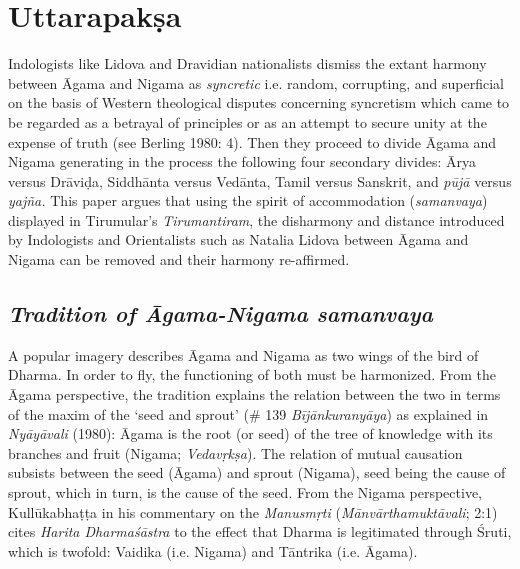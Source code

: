 \section*{Uttarapakṣa}

Indologists like Lidova and Dravidian nationalists dismiss the extant harmony between Āgama and Nigama as \textit{syncretic} i.e. random, corrupting, and superficial on the basis of Western theological disputes concerning syncretism which came to be regarded as a betrayal of principles or as an attempt to secure unity at the expense of truth (see Berling 1980: 4). Then they proceed to divide Āgama and Nigama generating in the process the following four secondary divides: Ārya versus Drāviḍa, Siddhānta versus Vedānta, Tamil versus Sanskrit, and \textit{pūjā} versus \textit{yajña.} This paper argues that using the spirit of accommodation (\textit{samanvaya}) displayed in Tirumular’s \textit{Tirumantiram}, the disharmony and distance introduced by Indologists and Orientalists such as Natalia Lidova between Āgama and Nigama can be removed and their harmony re-affirmed.

\subsection*{\textit{Tradition of Āgama-Nigama samanvaya}}

A popular imagery describes Āgama and Nigama as two wings of the bird of Dharma. In order to fly, the functioning of both must be harmonized. From the Āgama perspective, the tradition explains the relation between the two in terms of the maxim of the ‘seed and sprout’ (\# 139 \textit{Bījānkuranyāya}) as explained in \textit{Nyāyāvali} (1980): Āgama is the root (or seed) of the tree of knowledge with its branches and fruit (Nigama; \textit{Vedavṛkṣa}). The relation of mutual causation subsists between the seed (Āgama) and sprout (Nigama), seed being the cause of sprout, which in turn, is the cause of the seed. From the Nigama perspective, Kullūkabhaṭṭa in his commentary on the \textit{Manusmṛti} (\textit{Mānvārthamuktāvali}; 2:1) cites \textit{Harita Dharmaśāstra} to the effect that Dharma is legitimated through Śruti, which is twofold: Vaidika (i.e. Nigama) and Tāntrika (i.e. Āgama).

\newpage


